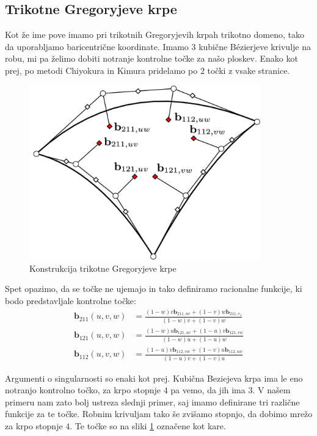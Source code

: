 \documentclass[a4paper,regno]{article}
\newcommand{\tbf}{\textbf}
\begin{document}
\subsection{Trikotne Gregoryjeve krpe}
Kot že ime pove imamo pri trikotnih Gregoryjevih krpah trikotno domeno, tako da uporabljamo baricentrične koordinate. Imamo $3$ kubične Bézierjeve krivulje na robu, mi pa želimo dobiti notranje kontrolne točke za našo ploskev. Enako kot prej, po metodi Chiyokura in Kimura pridelamo po $2$ točki z vsake stranice.
\begin{figure}[h]
	\centering
	\includegraphics[width=10cm]{gregory_krpe_trikotna.jpg}
	\caption{Konstrukcija trikotne Gregoryjeve krpe}
	\label{fig:trikotna}
\end{figure}

Spet opazimo, da se točke ne ujemajo in tako definiramo racionalne funkcije, ki bodo predstavljale kontrolne točke:
\begin{align*}
\tbf{b}_{211}(u,v,w) &= \frac{(1-w)v \tbf{b}_{211,uv}+(1-v)w\tbf{b}_{211,v_1}}{(1-w)v+(1-v)w} \\
\tbf{b}_{121}(u,v,w) &= \frac{(1-w)u \tbf{b}_{121,uv}+(1-u)v\tbf{b}_{121,vw}}{(1-w)u+(1-u)w} \\
\tbf{b}_{112}(u,v,w) &= \frac{(1-u)v \tbf{b}_{112,vw}+(1-v)u\tbf{b}_{112,uw}}{(1-u)v+(1-v)u} 
\end{align*}

Argumenti o singularnosti so enaki kot prej. Kubična Beziejeva krpa ima le eno notranjo kontrolno točko, za krpo stopnje $4$ pa vemo, da jih ima $3$. V našem primeru nam zato bolj ustreza slednji primer, saj imamo definirane tri različne funkcije za te točke. Robnim krivuljam tako še zvišamo stopnjo, da dobimo mrežo za krpo stopnje $4$. Te točke so na sliki \ref{fig:trikotna} označene kot kare.
\end{document}
